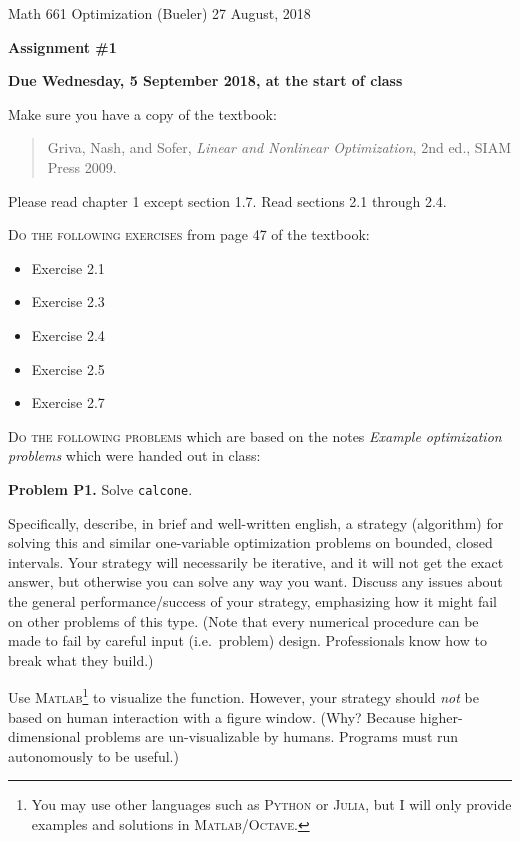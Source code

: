 \documentclass[12pt]{amsart}
\newcommand{\Julia}{\textsc{Julia}\xspace}
\newcommand{\Matlab}{\textsc{Matlab}\xspace}
\newcommand{\Octave}{\textsc{Octave}\xspace}
\newcommand{\Python}{\textsc{Python}\xspace}
\newcommand{\prob}[1]{\bigskip\noindent\textbf{#1}\quad }
\begin{document}
\scriptsize \noindent Math 661 Optimization (Bueler) \hfill 27 August, 2018
\normalsize

\medskip\bigskip

\Large\centerline{\textbf{Assignment \#1}}
\large
\bigskip

\centerline{\textbf{Due Wednesday, 5 September 2018, at the start of class}}
\bigskip
\normalsize

\thispagestyle{empty}

\bigskip
\noindent Make sure you have a copy of the textbook:

\begin{quote}
Griva, Nash, and Sofer, \emph{Linear and Nonlinear Optimization}, 2nd ed., SIAM Press 2009.
\end{quote}

\noindent Please read chapter 1 except section 1.7.  Read sections 2.1 through 2.4.

\bigskip
\noindent \textsc{Do the following exercises} from page 47 of the textbook:

\begin{itemize}
\item Exercise 2.1
\item Exercise 2.3
\item Exercise 2.4
\item Exercise 2.5
\item Exercise 2.7
\end{itemize}


\bigskip
\noindent \textsc{Do the following problems} which are based on the notes \emph{Example optimization problems} which were handed out in class:

\medskip
\prob{Problem P1.}  Solve \texttt{calcone}.

Specifically, describe, in brief and well-written english, a strategy (algorithm) for solving this and similar one-variable optimization problems on bounded, closed intervals.  Your strategy will necessarily be iterative, and it will not get the exact answer, but otherwise you can solve any way you want.  Discuss any issues about the general performance/success of your strategy, emphasizing how it might fail on other problems of this type.  (Note that every numerical procedure can be made to fail by careful input (i.e.~problem) design.  Professionals know how to break what they build.)

Use \Matlab\footnote{You may use other languages such as \Python or \Julia, but I will only provide examples and solutions in \Matlab/\Octave.} to visualize the function.  However, your strategy should \emph{not} be based on human interaction with a figure window.  (Why?  Because higher-dimensional problems are un-visualizable by humans.  Programs must run autonomously to be useful.)
\end{document}
